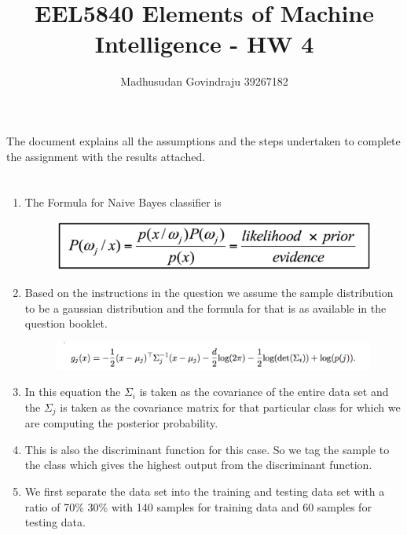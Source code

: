 \documentclass[10pt, letterpaper]{article}
\author{Madhusudan Govindraju 39267182 }
\date{}
\begin{document}
\title{EEL5840  Elements of Machine Intelligence - HW 4}
\maketitle

The document explains all the assumptions and the steps undertaken to complete the assignment with the results attached.

\section{}
\begin{enumerate}
\item The Formula for Naive Bayes classifier is

\begin{figure}[h!]
\centering
\includegraphics[scale=0.5]{Naive_bayes_general}
\end{figure}

\item Based on the instructions in the question we assume the sample distribution to be a gaussian distribution and the formula for that is as available in the question booklet. 

\begin{figure}[h!]
\centering
\includegraphics[scale=0.75]{MultivariateGaussian_naiveBayes}
\end{figure}

\item In this equation the $\Sigma_{i}$ is taken as the covariance of the entire data set and the $\Sigma_{j}$ is taken as the covariance matrix for that particular class for which we are computing the posterior probability.

\item This is also the discriminant function for this case. So we tag the sample to the class which gives the highest output from the discriminant function.

\item We first separate the data set into the training and testing data set with a ratio of 70\% 30\% with 140 samples for training data and 60 samples for testing data.


\end{enumerate}
\end{document}
